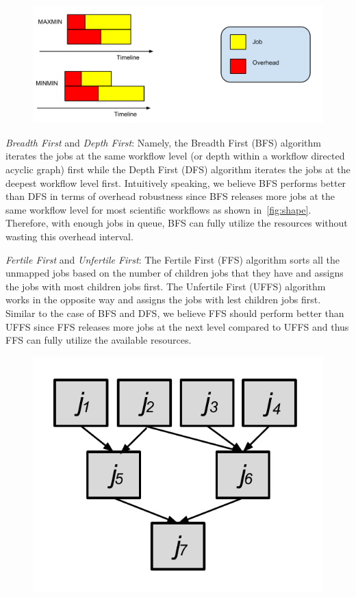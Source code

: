 \documentclass[final]{IEEEtran}
\begin{document}
\begin{figure}[htb]
\centering
 \includegraphics[width=1.0\linewidth]{figure/longest.pdf}
  \label{fig:longest}
  \vspace{-10pt}
\end{figure}
\emph{Breadth First} and \emph{Depth First}: Namely, the Breadth First (BFS) algorithm iterates the jobs at the same workflow level (or depth within a workflow directed acyclic graph) first while the Depth First (DFS) algorithm iterates the jobs at the deepest workflow level first. Intuitively speaking, we believe BFS performs better than DFS in terms of overhead robustness since BFS releases more jobs at the same workflow level for most scientific workflows as shown in~\ref{fig:shape}. Therefore, with enough jobs in queue, BFS can fully utilize the resources without wasting this overhead interval.  

\emph{Fertile First} and \emph{Unfertile First}: The Fertile First (FFS) algorithm sorts all the unmapped jobs based on the number of children jobs that they have and assigns the jobs with most children jobs first. The Unfertile First (UFFS) algorithm works in the opposite way and assigns the jobs with lest children jobs first. Similar to the case of BFS and DFS, we believe FFS should perform better than UFFS since FFS releases more jobs at the next level compared to UFFS and thus FFS can fully utilize the available resources. 

\begin{figure}[htb]
\centering
 \includegraphics[width=0.6\linewidth]{figure/impact_factor.pdf}
  \label{fig:impact}
  \vspace{-10pt}
\end{figure}
\end{document}
